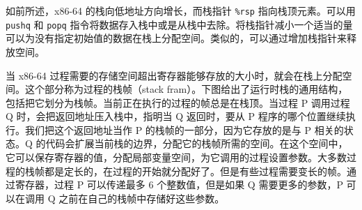 如前所述，x86-64 的栈向低地址方向增长，而栈指针 \verb|%rsp| 指向栈顶元素。可以用 \verb|pushq| 和 \verb|popq| 指令将数据存入栈中或是从栈中去除。将栈指针减小一个适当的量可以为没有指定初始值的数据在栈上分配空间。类似的，可以通过增加栈指针来释放空间。

当 x86-64 过程需要的存储空间超出寄存器能够存放的大小时，就会在栈上分配空间。这个部分称为过程的栈帧（stack fram）。下图给出了运行时栈的通用结构，包括把它划分为栈帧。当前正在执行的过程的帧总是在栈顶。当过程 P 调用过程 Q 时，会把返回地址压入栈中，指明当 Q 返回时，要从 P 程序的哪个位置继续执行。我们把这个返回地址当作 P 的栈帧的一部分，因为它存放的是与 P 相关的状态。Q 的代码会扩展当前栈的边界，分配它的栈帧所需的空间。在这个空间中，它可以保存寄存器的值，分配局部变量空间，为它调用的过程设置参数。大多数过程的栈帧都是定长的，在过程的开始就分配好了。但是有些过程需要变长的帧。通过寄存器，过程 P 可以传递最多 6 个整数值，但是如果 Q 需要更多的参数，P 可以在调用 Q 之前在自己的栈帧中存储好这些参数。


